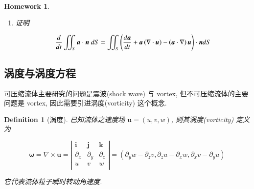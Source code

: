 \documentclass[11pt]{article}
\newtheorem{definition}{Definition}[subsection]
\newtheorem{homework}{Homework}[section]
\begin{document}
\begin{homework}
\begin{enumerate}
		速度 $ \boldsymbol{u} $ 每个分量之量纲为 $\left[ u \right] = \left[ {{u_r}} \right] = \left[ {{u_\theta }} \right] = \left[ {{u_z}} \right] = \frac{L}{T}$, 请验证每项都满足量纲平衡之关系. 
		\item 证明
		
		\begin{equation}
		\frac{d}{{dt}}\iint_S {\boldsymbol{a} \cdot \boldsymbol{n}\;dS} = \iint_S {\left( {\frac{{d\boldsymbol{a}}}{{dt}} + \boldsymbol{a}\left( {\nabla  \cdot \boldsymbol{u}} \right) - \left( {\boldsymbol{a} \cdot \nabla } \right)\boldsymbol{u}} \right) \cdot \boldsymbol{n}dS}
		\notag 
		\end{equation}
		
	\end{enumerate}
	\label{hom5.2}
\end{homework}


\newpage 

\subsection{\kaishu 涡度与涡度方程}

可压缩流体主要研究的问题是震波(shock wave) 与 vortex, 但不可压缩流体的主要问题是 vortex, 因此需要引进涡度(vorticity) 这个概念.

\begin{definition}[\kaishu 涡度]
	已知流体之速度场 $\boldsymbol{u} = \left( {u,v,w} \right)$, 则其涡度(vorticity) 定义为
	
	\begin{equation}
	\boldsymbol{\omega} = \nabla \times \boldsymbol{u} = \left| {\begin{matrix}
		\boldsymbol{i} & \boldsymbol{j} & \boldsymbol{k}  \\ 
		{{\partial _x}} & {{\partial _y}} & {{\partial _z}}  \\ 
		u & v & w  \\ 
		\end{matrix} } \right| = \left( {{\partial _y}w - {\partial _z}v,{\partial _z}u - {\partial _x}w,{\partial _x}v - {\partial _y}u} \right)
	\label{eq5.3.1}
	\end{equation}
	
	它代表流体粒子瞬时转动角速度.
\label{def5.3.1}	
\end{definition}
\end{document}
